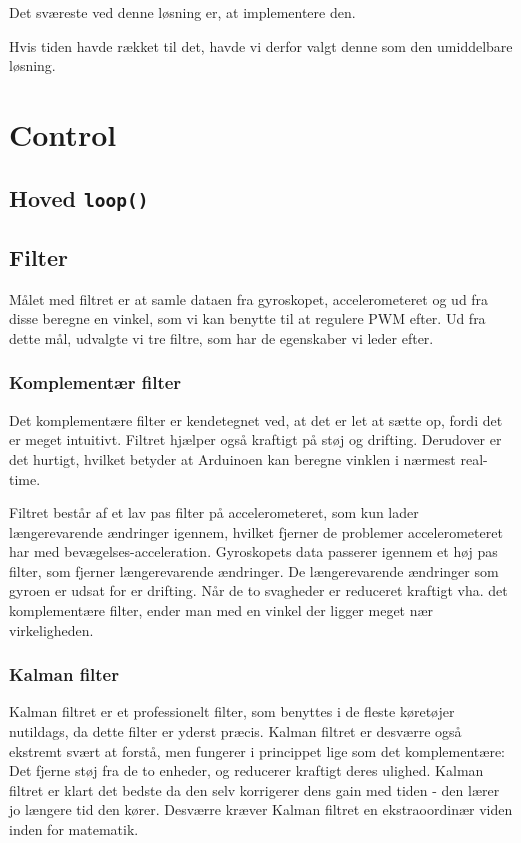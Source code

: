 \documentclass[a4paper,oneside,article,danish,table]{memoir}
\begin{document}
Det sværeste ved denne løsning er, at implementere den. 

Hvis tiden havde rækket til det, havde vi derfor valgt denne som den umiddelbare løsning.
\chapter{Control}
\section{Hoved \lstinline{loop()}}
\section{Filter}\label{sec:filter}
Målet med filtret er at samle dataen fra gyroskopet, accelerometeret og ud fra disse beregne en vinkel, som vi kan benytte til at regulere PWM efter. Ud fra dette mål, udvalgte vi tre filtre, som har de egenskaber vi leder efter.
\subsection{Komplementær filter}
Det komplementære filter er kendetegnet ved, at det er let at sætte op, fordi det er meget intuitivt. Filtret hjælper også kraftigt på støj og drifting. Derudover er det hurtigt, hvilket betyder at Arduinoen kan beregne vinklen i nærmest real-time. 

Filtret består af et lav pas filter på accelerometeret, som kun lader længerevarende ændringer igennem, hvilket fjerner de problemer accelerometeret har med bevægelses-acceleration. Gyroskopets data passerer igennem et høj pas filter, som fjerner længerevarende ændringer. De længerevarende ændringer som gyroen er udsat for er drifting. Når de to svagheder er reduceret kraftigt vha. det komplementære filter, ender man med en vinkel der ligger meget nær virkeligheden.
\subsection{Kalman filter}
Kalman filtret er et professionelt filter, som benyttes i de fleste køretøjer nutildags, da dette filter er yderst præcis. Kalman filtret er desværre også ekstremt svært at forstå, men fungerer i princippet lige som det komplementære: Det fjerne støj fra de to enheder, og reducerer kraftigt deres ulighed. Kalman filtret er klart det bedste da den selv korrigerer dens gain med tiden - den lærer jo længere tid den kører. Desværre kræver Kalman filtret en ekstraoordinær viden inden for matematik.
\end{document}
